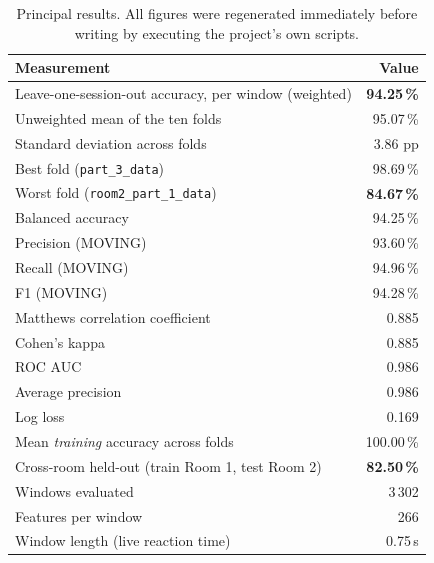 \documentclass[11pt,a4paper,oneside]{report}
\newcommand{\code}[1]{\texttt{\small #1}}
\begin{document}
\begin{table}[H]
\centering
\caption{Principal results. All figures were regenerated immediately before
writing by executing the project's own scripts.}
\label{tab:results}
\begin{tabularx}{\linewidth}{@{}Xr@{}}
\toprule
\textbf{Measurement} & \textbf{Value} \\
\midrule
Leave-one-session-out accuracy, per window (weighted) & \textbf{94.25\,\%} \\
Unweighted mean of the ten folds                      & 95.07\,\% \\
Standard deviation across folds                       & 3.86 pp \\
Best fold (\code{part\_3\_data})                      & 98.69\,\% \\
Worst fold (\code{room2\_part\_1\_data})              & \textbf{84.67\,\%} \\
\midrule
Balanced accuracy                                     & 94.25\,\% \\
Precision (MOVING)                                    & 93.60\,\% \\
Recall (MOVING)                                       & 94.96\,\% \\
F1 (MOVING)                                           & 94.28\,\% \\
Matthews correlation coefficient                      & 0.885 \\
Cohen's kappa                                         & 0.885 \\
ROC AUC                                               & 0.986 \\
Average precision                                     & 0.986 \\
Log loss                                              & 0.169 \\
\midrule
Mean \emph{training} accuracy across folds            & 100.00\,\% \\
Cross-room held-out (train Room 1, test Room 2)       & \textbf{82.50\,\%} \\
\midrule
Windows evaluated                                     & 3\,302 \\
Features per window                                   & 266 \\
Window length (live reaction time)                    & 0.75\,s \\
\bottomrule
\end{tabularx}
\end{table}
\end{document}

